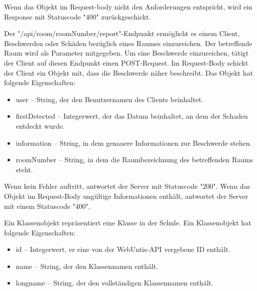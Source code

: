 Wenn das Objekt im Request-body nicht den Anforderungen entspricht, wird ein Response mit Statuscode "400" zurückgeschickt. 


Der "/api/room/{roomNumber}/report"-Endpunkt ermöglicht es einem Client, Beschwerden oder Schäden bezüglich eines Raumes einzureichen. Der betreffende Raum wird als Parameter mitgegeben. Um eine Beschwerde einzureichen, tätigt der Client auf diesen Endpunkt einen POST-Request. Im Request-Body schickt der Client ein Objekt mit, dass die Beschwerde näher beschreibt. Das Objekt hat folgende Eigenschaften:

\begin{itemize}
    \item user -- String, der den Benutzernamen des Clients beinhaltet.
    \item firstDetected -- Integerwert, der das Datum beinhaltet, an dem der Schaden entdeckt wurde. 
    \item information -- String, in dem genauere Informationen zur Beschwerde stehen. 
    \item roomNumber -- String, in dem die Raumbezeichnung des betreffenden Raums steht. 
\end{itemize}

Wenn kein Fehler auftritt, antwortet der Server mit Statuscode "200". Wenn das Objekt im Request-Body ungültige Informationen enthält, antwortet der Server mit einem Statuscode "400".

\pagebreak


Ein Klassenobjekt repräsentiert eine Klasse in der Schule. Ein Klassenobjekt hat folgende Eigenschaften: 

\begin{itemize}
    \item id -- Integerwert, er eine von der WebUntis-API vergebene ID enthält. 
    \item name -- String, der den Klassennamen enthält. 
    \item longname -- String, der den vollständigen Klassennamen enthält. 
\end{itemize}


